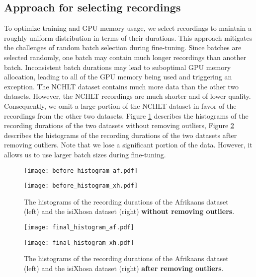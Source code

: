 \subsection{Approach for selecting recordings}
To optimize training and GPU memory usage, we select recordings to maintain a roughly uniform distribution in terms of their durations.
This approach mitigates the challenges of random batch selection during fine-tuning.
Since batches are selected randomly, one batch may contain much longer recordings than another batch.
Inconsistent batch durations may lead to suboptimal GPU memory allocation, leading to all of the GPU memory being used and triggering an exception.
The NCHLT dataset contains much more data than the other two datasets. However, the NCHLT recordings are much shorter and of lower quality. 
Consequently, we omit a large portion of the NCHLT dataset in favor of the recordings from the other two datasets.
Figure \ref{fig:histogram1} describes the histograms of the recording durations of the two datasets without removing outliers,
Figure \ref{fig:histogram2} describes the histograms of the recording durations of the two datasets after removing outliers.
Note that we lose a significant portion of the data. However, it allows us to use larger batch sizes during fine-tuning.

\begin{figure}[!ht]
    \centering
    \begin{minipage}{.50\textwidth}
      \centering
      \texttt{[image: before\_histogram\_af.pdf]}
    \end{minipage}%
    \begin{minipage}{.50\textwidth}
      \centering
      \texttt{[image: before\_histogram\_xh.pdf]}
    \end{minipage}
    \caption{The histograms of the recording durations of the Afrikaans dataset (left) and the isiXhosa dataset (right) \textbf{without removing outliers}.}
    \label{fig:histogram1}
\end{figure}

\begin{figure}[!ht]
    \centering
    \begin{minipage}{.50\textwidth}
      \centering
      \texttt{[image: final\_histogram\_af.pdf]}
    \end{minipage}%
    \begin{minipage}{.50\textwidth}
      \centering
      \texttt{[image: final\_histogram\_xh.pdf]}
    \end{minipage}
    \caption{The histograms of the recording durations of the Afrikaans dataset (left) and the isiXhosa dataset (right) \textbf{after removing outliers}.}
    \label{fig:histogram2}
\end{figure}


